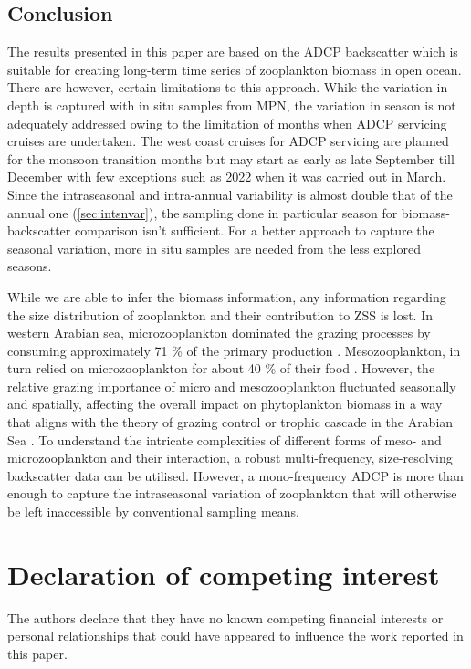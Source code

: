 \documentclass{article}
\begin{document}
	\subsection{Conclusion}
	The results presented in this paper are based on the ADCP backscatter which is suitable for creating long-term time series of zooplankton biomass in open ocean. There are however, certain limitations to this approach. While the variation in depth is captured with in situ samples from MPN, the variation in season is not adequately addressed owing to the limitation of months when ADCP servicing cruises are undertaken. The west coast cruises for ADCP servicing are planned for the monsoon transition months but may start as early as late September till December with few exceptions such as 2022 when it was carried out in March. Since the intraseasonal and intra-annual variability is almost double that of the annual one (\autoref{sec:intsnvar}), the sampling done in particular season for biomass-backscatter comparison isn't sufficient. For a better approach to capture the  seasonal variation, more in situ samples are needed from the less explored seasons. 
	
	While we are able to infer the biomass information, any information regarding the size distribution of zooplankton and their contribution to ZSS is lost. In western Arabian sea, microzooplankton dominated the grazing processes by consuming approximately 71 \% of the primary production \citep{reckermann1997-kz,marra2005jgofs,landry2009-ti}. Mesozooplankton, in turn relied on microzooplankton for about 40 \% of their food \citep{landry2009-ti,hood2024nutrient}. However, the relative grazing importance of micro and mesozooplankton fluctuated seasonally and spatially, affecting the overall impact on phytoplankton biomass in a way that aligns with the theory of grazing control or trophic cascade \citep{ripple2016-nk} in the Arabian Sea \citep{marra2005jgofs,landry2009-ti}. To understand the intricate complexities of different forms of meso- and microzooplankton and their interaction, a robust multi-frequency, size-resolving backscatter data can be utilised. However, a mono-frequency ADCP is more than enough to capture the intraseasonal variation of zooplankton that will otherwise be left inaccessible by conventional sampling means.
	
	\section{Declaration of competing interest}
	The authors declare that they have no known competing financial interests or personal
	relationships that could have appeared to influence the work reported in this paper.
	
\end{document}
